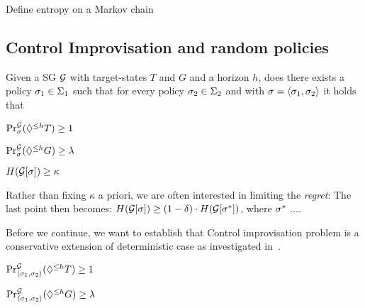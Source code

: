 Define entropy on a Markov chain



\subsection{Control Improvisation and random policies}

\begin{mdframed}
Given a SG $\mathcal{G}$ with target-states $T$ and $G$ and a horizon $h$, does there exists a policy $\sigma_1 \in \Sigma_1$  such that for every policy $\sigma_2 \in \Sigma_2$ and with $\sigma = \langle \sigma_1, \sigma_2 \rangle$ it holds that 
\begin{compactenum}
	\item $\Pr^{\mathcal{G}}_{\sigma}(\lozenge^{\leq h} T) \geq 1$
	\item $\Pr^{\mathcal{G}}_{\sigma}(\lozenge^{\leq h} G) \geq \lambda$
	\item $H(\mathcal{G}[\sigma]) \geq \kappa$
\end{compactenum}
\end{mdframed}
Rather than fixing $\kappa$ a priori, we are often interested in limiting the \emph{regret}: The last point then becomes:
$H(\mathcal{G}[\sigma]) \geq (1-\delta) \cdot H(\mathcal{G}[\sigma^{*}])$, where $\sigma^{*}$ ....  


Before we continue, we want to establish that Control improvisation problem is a conservative extension of deterministic case as investigated in~\cite{}.
\begin{lemma}
	
\end{lemma}


\begin{mdframed}

\begin{compactenum}
	\item $\Pr^{\mathcal{G}}_{\langle \sigma_1,\sigma_2 \rangle}(\lozenge^{\leq h} T) \geq 1$
	\item $\Pr^{\mathcal{G}}_{\langle \sigma_1,\sigma_2 \rangle}(\lozenge^{\leq h} G) \geq \lambda$ 
\end{compactenum}
\end{mdframed}


